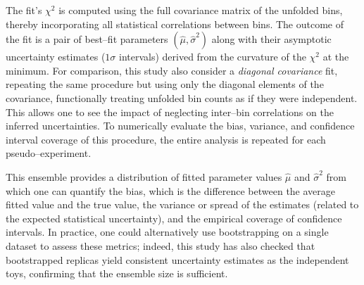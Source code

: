             The fit’s $\chi^2$ is computed using the full covariance matrix of the unfolded bins, thereby incorporating all statistical correlations between bins.
            The outcome of the fit is a pair of best--fit parameters $(\hat{\mu}, \hat{\sigma}^2)$ along with their asymptotic uncertainty estimates (\(1\sigma\) intervals) derived from the curvature of the $\chi^2$ at the minimum.
            For comparison, this study also consider a \emph{diagonal covariance} fit, repeating the same procedure but using only the diagonal elements of the covariance, functionally treating unfolded bin counts as if they were independent.
            This allows one to see the impact of neglecting inter--bin correlations on the inferred uncertainties.
            To numerically evaluate the bias, variance, and confidence interval coverage of this procedure, the entire analysis is repeated for each pseudo--experiment.
            
            This ensemble provides a distribution of fitted parameter values $\hat{\mu}$ and $\hat{\sigma}^2$ from which one can quantify the bias, which is the difference between the average fitted value and the true value, the variance or spread of the estimates (related to the expected statistical uncertainty), and the empirical coverage of confidence intervals.
            In practice, one could alternatively use bootstrapping on a single dataset to assess these metrics; indeed, this study has also checked that bootstrapped replicas yield consistent uncertainty estimates as the independent toys, confirming that the ensemble size is sufficient.

